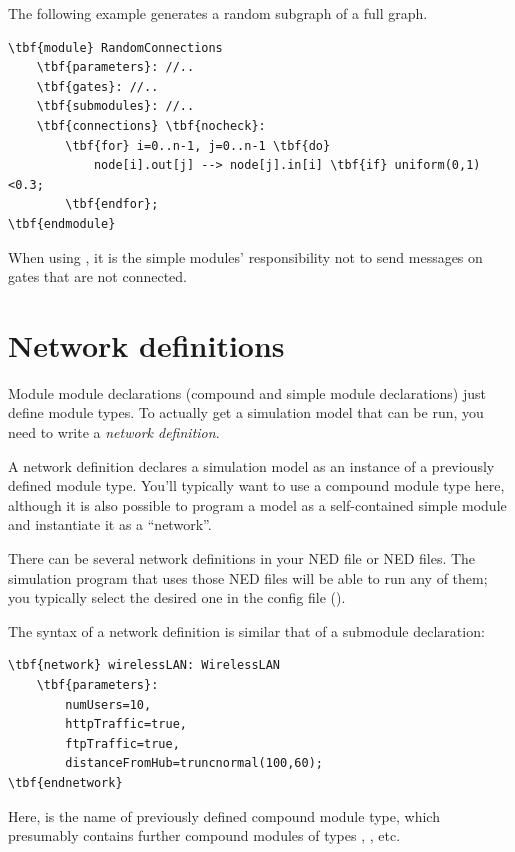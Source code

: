 The following example generates a random subgraph of a full graph.

\begin{Verbatim}[commandchars=\\\{\}]
\tbf{module} RandomConnections
    \tbf{parameters}: //..
    \tbf{gates}: //..
    \tbf{submodules}: //..
    \tbf{connections} \tbf{nocheck}:
        \tbf{for} i=0..n-1, j=0..n-1 \tbf{do}
            node[i].out[j] --> node[j].in[i] \tbf{if} uniform(0,1)<0.3;
        \tbf{endfor};
\tbf{endmodule}
\end{Verbatim}

When using , it is the
simple modules' responsibility not to send messages on gates
that are not connected.


\section{Network definitions}
\label{sec:ch-ned-lang:network}

Module module declarations (compound and simple module declarations)
just define module types. To actually get a simulation model that
can be run, you need to write a \textit{network definition}.

A network definition declares a simulation model as an instance
of a previously defined module type. You'll typically want to use
a compound module type here, although it is also possible to
program a model as a self-contained simple module and instantiate it
as a ``network''.

There can be several network definitions in your NED file or NED files.
The simulation program that uses those NED files will be
able to run any of them; you typically select the desired one
in the config file ().

The syntax of a network definition is similar that of a submodule
declaration:

\begin{Verbatim}[commandchars=\\\{\}]
\tbf{network} wirelessLAN: WirelessLAN
    \tbf{parameters}:
        numUsers=10,
        httpTraffic=true,
        ftpTraffic=true,
        distanceFromHub=truncnormal(100,60);
\tbf{endnetwork}
\end{Verbatim}

Here,  is the name of previously defined
compound module type, which presumably contains further
compound modules of types , , etc.

